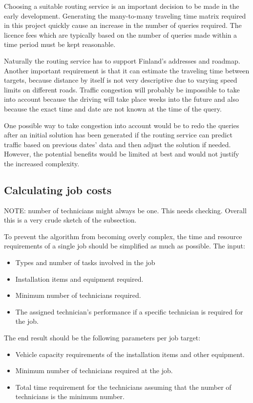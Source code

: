 Choosing a suitable routing service is an important decision to be made in the early development. Generating the many-to-many traveling time matrix required in this project quickly cause an increase in the number of queries required. The licence fees which are typically based on the number of queries made within a time period must be kept reasonable.

Naturally the routing service has to support Finland's addresses and roadmap. Another important requirement is that it can estimate the traveling time between targets, because distance by itself is not very descriptive due to varying speed limits on different roads. Traffic congestion will probably be impossible to take into account because the driving will take place weeks into the future and also because the exact time and date are not known at the time of the query. 

One possible way to take congestion into account would be to redo the queries after an initial solution has been generated if the routing service can predict traffic based on previous dates' data and then adjust the solution if needed. However, the potential benefits would be limited at best and would not justify the increased complexity.


\subsection{Calculating job costs}

NOTE: number of technicians might always be one. This needs checking. Overall this is a very crude sketch of the subsection. 

To prevent the algorithm from becoming overly complex, the time and resource requirements of a single job should be simplified as much as possible. The input:

\begin{itemize}
\item Types and number of tasks involved in the job
\item Installation items and equipment required.
\item Minimum number of technicians required.
\item The assigned technician's performance if a specific technician is required for the job.   
\end{itemize}

The end result should be the following parameters per job target:

\begin{itemize}
\item Vehicle capacity requirements of the installation items and other equipment.
\item Minimum number of technicians required at the job.
\item Total time requirement for the technicians assuming that the number of technicians is the minimum number.  
\end{itemize}

